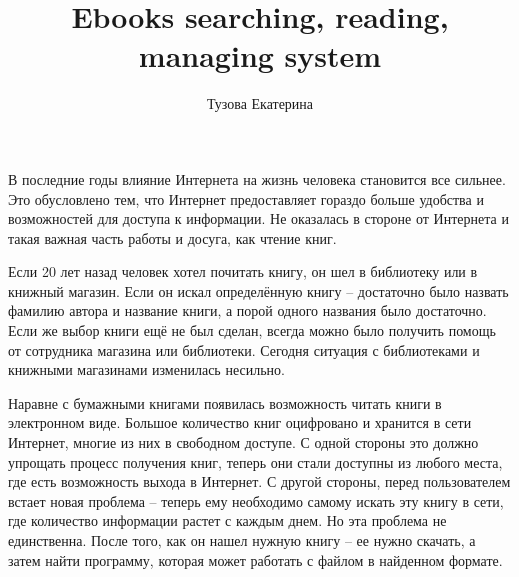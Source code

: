 \documentclass[a4paper]{report}
\begin{document}
\author{Тузова Екатерина}
\title{Ebooks searching, reading, managing system}

\maketitle



\newpage
\tableofcontents
\newpage

В последние годы влияние Интернета на жизнь человека становится все сильнее. Это обусловлено тем, что Интернет предоставляет гораздо больше удобства и возможностей для доступа к информации. Не оказалась в стороне от Интернета и такая важная часть работы и досуга, как чтение книг.

 Если 20 лет назад человек хотел почитать книгу, он шел в библиотеку или в книжный магазин. Если он искал определённую книгу -- достаточно было назвать фамилию автора и название книги, а порой одного названия было достаточно. Если же выбор книги ещё не был сделан, всегда можно было получить помощь от сотрудника магазина или библиотеки. Сегодня ситуация с библиотеками и книжными магазинами изменилась несильно. 

Наравне с бумажными книгами появилась возможность читать книги в электронном виде. Большое количество книг оцифровано и хранится в сети Интернет, многие из них в свободном доступе. С одной стороны это должно упрощать процесс получения книг, теперь они стали доступны из любого места, где есть возможность выхода в Интернет. С другой стороны, перед пользователем встает новая проблема -- теперь ему необходимо самому искать эту книгу в сети, где количество информации растет с каждым днем. Но эта проблема не единственна. После того, как он нашел нужную книгу -- ее нужно скачать, а затем найти программу, которая может работать с файлом в найденном формате. 
\end{document}
